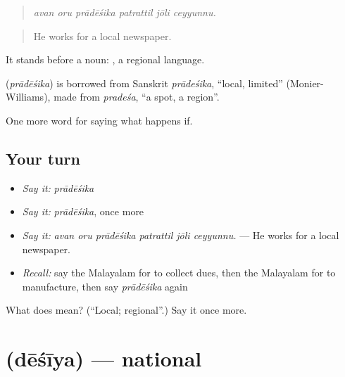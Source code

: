 \begin{quote}
\emph{avan oru prādēśika patrattil jōli ceyyunnu.}
\end{quote}

\begin{quote}
He works for a local newspaper.
\end{quote}

It stands before a noun:  , a regional language.

\begin{cousinweb}
\textbf{} (\emph{prādēśika}) is borrowed from Sanskrit \emph{prādeśika}, \textquotedblleft{}local, limited\textquotedblright{} (Monier-Williams), made from \emph{pradeśa}, \textquotedblleft{}a spot, a region\textquotedblright{}.
\end{cousinweb}

\begin{grammarlens}[title={What you've built}]
One more word for saying what happens if.
\end{grammarlens}

\subsection*{Your turn}
\begin{itemize}
\raggedright
  \item \emph{Say it:} \emph{prādēśika}
  \item \emph{Say it:} \emph{prādēśika}, once more
  \item \emph{Say it:} \emph{avan oru prādēśika patrattil jōli ceyyunnu.} — He works for a local newspaper.
  \item \emph{Recall:} say the Malayalam for to collect dues, then the Malayalam for to manufacture, then say \emph{prādēśika} again
\end{itemize}

\begin{tcolorbox}[breakable,colback=teal!4,colframe=teal!35!black,title={Before you move on}]
What does  mean? (\textquotedblleft{}Local; regional\textquotedblright{}.) Say it once more.
\end{tcolorbox}
\section[\texorpdfstring{\ml{ദേശീയ} (dēśīya)}{ദേശീയ (dēśīya)}]{ (dēśīya) — national}

\label{lesson:ML-C459-desiya}



